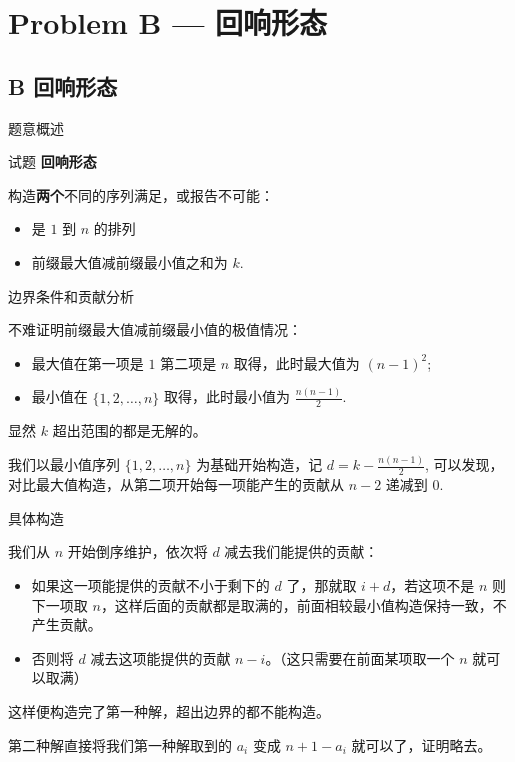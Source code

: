 \documentclass{beamer}
\newcommand{\TT}[1] {{\ttfamily #1}}
\newcommand{\BF}[1] {\textbf{#1}}
\begin{document}
{

\section[B]{Problem B — 回响形态}
\subsection{B 回响形态}

\begin{frame}{题意概述}

\begin{center}
试题 \myboxii{      \BF{\TT{B}}} \BF{回响形态}
\end{center}

构造\BF{两个}不同的序列满足，或报告不可能：

\begin{itemize}
  \item 是 $1$ 到 $n$ 的排列
  \item 前缀最大值减前缀最小值之和为 $k$.
\end{itemize}


\end{frame}


\begin{frame}{边界条件和贡献分析}

不难证明前缀最大值减前缀最小值的极值情况：
\begin{itemize}
  \item 最大值在第一项是 $1$ 第二项是 $n$ 取得，此时最大值为 $(n - 1)^2$;
  \item 最小值在 $\{1, 2, \ldots, n\}$ 取得，此时最小值为 $\frac{n(n - 1)}{2}$.
\end{itemize}

显然 $k$ 超出范围的都是无解的。

我们以最小值序列 $\{1, 2, \ldots, n\}$ 为基础开始构造，记 $d = k - \frac{n(n - 1)}{2}$, 可以发现，对比最大值构造，从第二项开始每一项能产生的贡献从 $n - 2$ 递减到 $0$.


\end{frame}

\begin{frame}{具体构造}

我们从 $n$ 开始倒序维护，依次将 $d$ 减去我们能提供的贡献：

\begin{itemize}
  \item 如果这一项能提供的贡献不小于剩下的 $d$ 了，那就取 $i + d$，若这项不是 $n$ 则下一项取 $n$，这样后面的贡献都是取满的，前面相较最小值构造保持一致，不产生贡献。
  \item 否则将 $d$ 减去这项能提供的贡献 $n - i$。（这只需要在前面某项取一个 $n$ 就可以取满）
\end{itemize}

这样便构造完了第一种解，超出边界的都不能构造。

第二种解直接将我们第一种解取到的 $a_i$ 变成 $n + 1 - a_i$ 就可以了，证明略去。

\end{frame}


}
\end{document}
